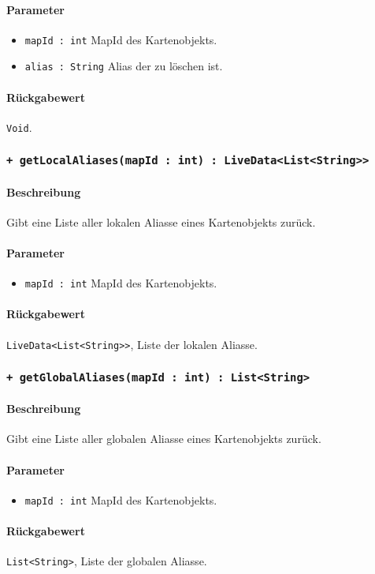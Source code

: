 \paragraph*{Parameter}
\begin{itemize}
    \item \texttt{mapId : int} MapId des Kartenobjekts.
    \item \texttt{alias : String} Alias der zu löschen ist.
\end{itemize}
\paragraph*{Rückgabewert}
\texttt{Void}.

\subsubsection*{\texttt{+ getLocalAliases(mapId : int) : LiveData<List<String>>}}\label{App_AddAlias_LocalAliasManager_getLocalAliases}%
\paragraph*{Beschreibung}
Gibt eine Liste aller lokalen Aliasse eines Kartenobjekts zurück.
\paragraph*{Parameter}
\begin{itemize}
    \item \texttt{mapId : int} MapId des Kartenobjekts.
\end{itemize}
\paragraph*{Rückgabewert}
\texttt{LiveData<List<String>>}, Liste der lokalen Aliasse.

\subsubsection*{\texttt{+ getGlobalAliases(mapId : int) : List<String>}}\label{App_AddAlias_LocalAliasManager_getGlobalAliases}%
\paragraph*{Beschreibung}
Gibt eine Liste aller globalen Aliasse eines Kartenobjekts zurück. 
\paragraph*{Parameter}
\begin{itemize}
    \item \texttt{mapId : int} MapId des Kartenobjekts.
\end{itemize}
\paragraph*{Rückgabewert}
\texttt{List<String>}, Liste der globalen Aliasse.